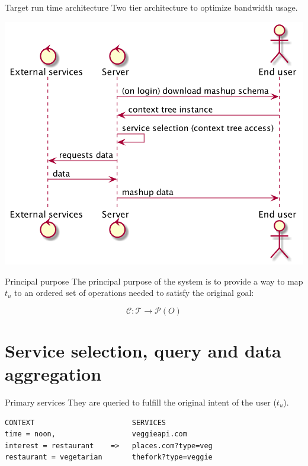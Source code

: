 \documentclass[smaller]{beamer}
\begin{document}
\begin{frame}[label={sec:orgheadline7}]{Target run time architecture}
Two tier architecture to optimize bandwidth usage.

\begin{center}
\includegraphics[width=.9\linewidth]{images/runtime.png}
\end{center}
\end{frame}

\begin{frame}[label={sec:orgheadline8}]{Principal purpose}
The \alert{principal purpose} of the system is to provide a way to map \(t_u\) to an 
ordered set of operations needed to satisfy the original goal:

\begin{equation}
\mathcal{C}: \mathcal{T} \rightarrow \mathcal{P}(O)
\end{equation}
\end{frame}

\section{Service selection, query and data aggregation}
\label{sec:orgheadline16}
\begin{frame}[fragile,label={sec:orgheadline10}]{Primary services}
 They are queried to \alert{fulfill} the original intent of the user (\(t_u\)). 

\begin{verbatim}
CONTEXT                       SERVICES
time = noon,                  veggieapi.com
interest = restaurant    =>   places.com?type=veg
restaurant = vegetarian       thefork?type=veggie
\end{verbatim}
\end{frame}
\end{document}
